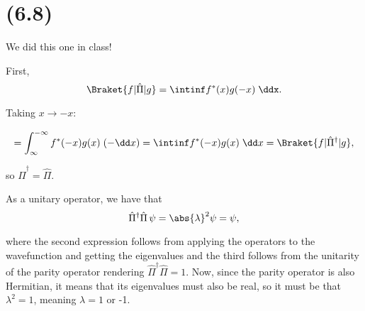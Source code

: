\section{(6.8)}


We did this one in class!


\begin{parts}
\item First,
  \begin{equation}
    \Braket{f | \hat\Pi | g} = \intinf f^*(x) g(-x) \; \ddx.
  \end{equation}

  Taking $x \rightarrow -x$:

  \begin{equation}
    = \int_{\infty}^{-\infty} f^*(-x) g(x) \;(-\dd x) = \intinf f^*(-x) g(x) \;\dd x = \Braket{f | \hat{\Pi}^\dagger | g},
  \end{equation}

  so $\boxed{\hat\Pi^\dagger = \hat\Pi.}$



\item As a unitary operator, we have that
  \begin{equation}
    \hat\Pi^\dagger\hat\Pi \, \psi = \abs{\lambda}^2 \psi = \psi,
  \end{equation}

  where the second expression follows from applying the operators to the wavefunction and getting the eigenvalues and the third follows from the unitarity of the parity operator rendering $\hat\Pi^\dagger\hat\Pi = 1$. Now, since the parity operator is also Hermitian, it means that its eigenvalues must also be real, so it must be that $\lambda^2 = 1$, meaning $\lambda = 1$ or -1.
\end{parts}





